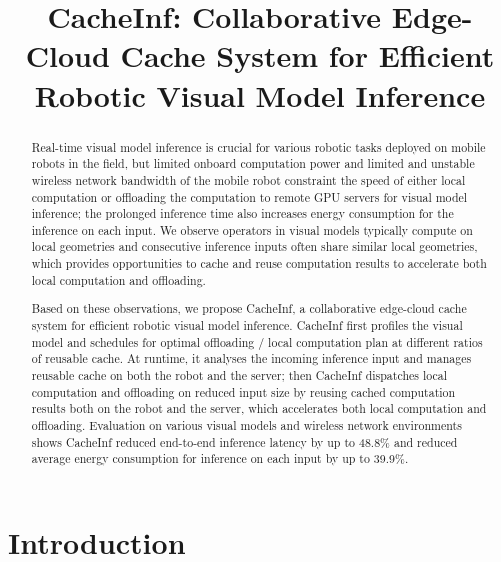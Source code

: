 \documentclass[nonacm,sigplan]{acmart}
\begin{document}
\title{CacheInf: Collaborative Edge-Cloud Cache System for Efficient Robotic Visual Model Inference}


\begin{abstract}
  Real-time visual model inference is crucial for various robotic tasks deployed on mobile robots in the field, but limited onboard computation power and limited and unstable wireless network bandwidth of the mobile robot constraint the speed of either local computation or offloading the computation to remote GPU servers for visual model inference; the prolonged inference time also increases energy consumption for the inference on each input.
  We observe operators in visual models typically compute on local geometries and consecutive inference inputs often share similar local geometries, which provides opportunities to cache and reuse computation results to accelerate both local computation and offloading.

  Based on these observations, we propose CacheInf, a collaborative edge-cloud cache system for efficient robotic visual model inference.
  CacheInf first profiles the visual model and schedules for optimal offloading / local computation plan at different ratios of reusable cache.
  At runtime, it analyses the incoming inference input and manages reusable cache on both the robot and the server; then CacheInf dispatches local computation and offloading on reduced input size by reusing cached computation results both on the robot and the server, which accelerates both local computation and offloading.
  Evaluation on various visual models and wireless network environments shows CacheInf reduced end-to-end inference latency by up to 48.8\% and reduced average energy consumption for inference on each input by up to 39.9\%.

\end{abstract}

\maketitle %
\pagestyle{plain} %


\section{Introduction}

\end{document}
